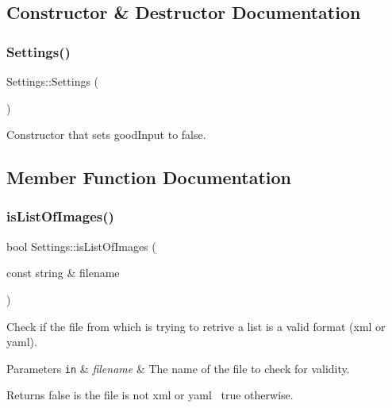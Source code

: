 \subsection{Constructor \& Destructor Documentation}
\mbox{\label{class_settings_ab7169a6eefce79566dd07db3b1e5e967}} 
\subsubsection{\texorpdfstring{Settings()}{Settings()}}
{\footnotesize\ttfamily Settings\+::\+Settings (\begin{DoxyParamCaption}{ }\end{DoxyParamCaption})\hspace{0.3cm}{\ttfamily [inline]}}



Constructor that sets {\ttfamily good\+Input} to false. 



\subsection{Member Function Documentation}
\mbox{\label{class_settings_af5003738fba7def4d4d9850a08eecacb}} 
\subsubsection{\texorpdfstring{is\+List\+Of\+Images()}{isListOfImages()}}
{\footnotesize\ttfamily bool Settings\+::is\+List\+Of\+Images (\begin{DoxyParamCaption}\item[{const string \&}]{filename }\end{DoxyParamCaption})\hspace{0.3cm}{\ttfamily [static]}}



Check if the file from which is trying to retrive a list is a valid format (xml or yaml). 


\begin{DoxyParams}[1]{Parameters}
\mbox{\tt in}  & {\em filename} & The name of the file to check for validity. \\
\hline
\end{DoxyParams}
\begin{DoxyReturn}{Returns}
{\ttfamily false} is the file is not xml or yaml~\newline
 {\ttfamily true} otherwise. 
\end{DoxyReturn}
\mbox{\label{class_settings_a7701462e928f2425b342440fba9973e5}} 
